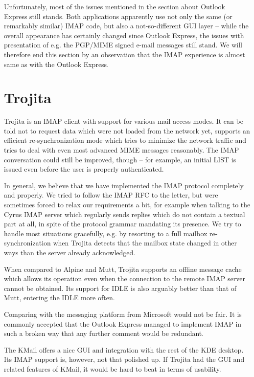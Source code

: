 \documentclass[12pt,notitlepage]{report}
\newcommand{\trojita}{Trojita\xspace}
\begin{document}
Unfortunately, most of the issues mentioned in the section about Outlook Express
still stands.  Both applications apparently use not only the same (or remarkably
similar) IMAP code, but also a not-so-different GUI layer -- while the overall
appearance has certainly changed since Outlook Express, the issues with
presentation of e.g. the PGP/MIME signed e-mail messages still stand.  We will
therefore end this section by an observation that the IMAP experience is almost
same as with the Outlook Express.

\section{\trojita}

\trojita is an  IMAP client with support for various mail access modes.  It
can be told not to request data which were not loaded from the network yet,
supports an efficient re-synchronization mode which tries to minimize the
network traffic and tries to deal with even most advanced MIME messages
reasonably.  The IMAP conversation could still be improved, though -- for
example, an initial LIST is issued even before the user is properly
authenticated.

In general, we believe that we have implemented the IMAP protocol completely and
properly.  We tried to follow the IMAP RFC to the letter, but were sometimes
forced to relax our requirements a bit, for example when talking to the Cyrus
IMAP server which regularly sends replies which do not contain a textual part at
all, in spite of the protocol grammar mandating its presence.  We try to handle
most situations gracefully, e.g. by resorting to a full mailbox
re-synchronization when \trojita detects that the mailbox state changed in other
ways than the server already acknowledged.

When compared to Alpine and Mutt, \trojita supports an offline message cache
which allows its operation even when the connection to the remote IMAP server
cannot be obtained.  Its support for IDLE is also arguably better than that of
Mutt, entering the IDLE more often.

Comparing with the messaging platform from Microsoft would not be fair.  It is
commonly accepted that the Outlook Express managed to implement IMAP in such a
broken way that any further comment would be redundant.

The KMail offers a nice GUI and integration with the rest of the KDE desktop.
Its IMAP support is, however, not that polished up.  If \trojita had the GUI and
related features of KMail, it would be hard to beat in terms of usability.
\end{document}

